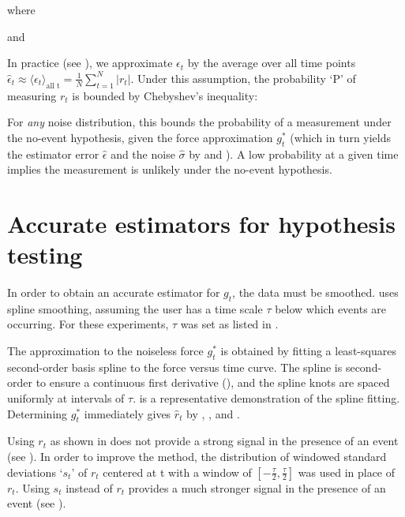 
where


and 


In practice (see ), we approximate $\epsilon_t$ by the average over all time points $\hat{\epsilon}_t \approx \langle \epsilon_t \rangle_{\text{all t}} = \frac{1}{N} \sum_{t=1}^N |r_t|$. Under this assumption, the probability `P' of measuring $r_t$ is bounded by Chebyshev's inequality:



For \emph{any} noise distribution, this bounds the probability of a measurement under the no-event hypothesis, given the force approximation $g^{*}_t$ (which in turn yields the estimator error $\hat{\epsilon}$ and the noise $\hat{\sigma}$ by  and ). A low probability at a given time implies the measurement is unlikely under the no-event hypothesis. \pl

\section{Accurate estimators for hypothesis testing}

\firstp In order to obtain an accurate estimator for $g_t$, the data must be smoothed. \name{} uses spline smoothing, assuming the user has a time scale $\tau$ below which events are occurring. For these experiments, $\tau$ was set as listed in . \pl 

The approximation to the noiseless force $g^{*}_t$ is obtained by fitting a least-squares second-order basis spline to the force versus time curve. The spline is second-order to ensure a continuous first derivative (), and the spline knots are spaced uniformly at intervals of $\tau$.  is a representative demonstration of the spline fitting. Determining  $g^{*}_t$ immediately gives $\hat{r}_t$ by  , , and . \pl

Using $r_t$ as shown in  does not provide a strong signal in the presence of an event (see ). In order to improve the method, the distribution of windowed standard deviations `$s_t$' of $r_t$ centered at t with a window of $[-\frac{\tau}{2},\frac{\tau}{2}]$ was used in place of $r_t$. Using $s_t$ instead of $r_t$ provides a much stronger signal in the presence of an event (see ).  \pl


